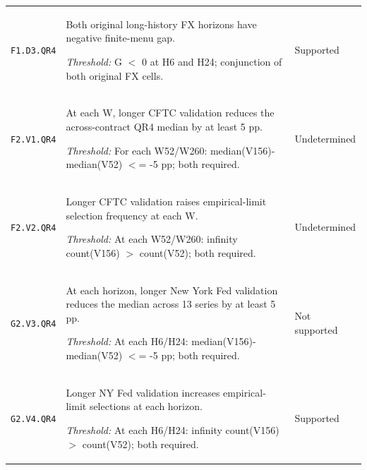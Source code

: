 \documentclass[12pt,a4paper]{article}
\begin{document}
{\begin{longtable}{p{2.0cm}p{10.5cm}p{2.5cm}}
\texttt{F1.\allowbreak{}D3.\allowbreak{}QR4} & Both original long-history FX horizons have negative finite-menu gap.\par\emph{Threshold:} G \ensuremath{<} 0 at H6 and H24; conjunction of both original FX cells. & Supported \\[3pt]
\texttt{F2.\allowbreak{}V1.\allowbreak{}QR4} & At each W, longer CFTC validation reduces the across-contract QR4 median by at least 5 pp.\par\emph{Threshold:} For each W52/\allowbreak{}W260: median(V156)-median(V52) \ensuremath{<}=\allowbreak{} -5 pp; both required. & Undetermined \\[3pt]
\texttt{F2.\allowbreak{}V2.\allowbreak{}QR4} & Longer CFTC validation raises empirical-limit selection frequency at each W.\par\emph{Threshold:} At each W52/\allowbreak{}W260: infinity count(V156) \ensuremath{>} count(V52); both required. & Undetermined \\[3pt]
\texttt{G2.\allowbreak{}V3.\allowbreak{}QR4} & At each horizon, longer New York Fed validation reduces the median across 13 series by at least 5 pp.\par\emph{Threshold:} At each H6/\allowbreak{}H24: median(V156)-median(V52) \ensuremath{<}=\allowbreak{} -5 pp; both required. & Not supported \\[3pt]
\texttt{G2.\allowbreak{}V4.\allowbreak{}QR4} & Longer NY Fed validation increases empirical-limit selections at each horizon.\par\emph{Threshold:} At each H6/\allowbreak{}H24: infinity count(V156) \ensuremath{>} count(V52); both required. & Supported \\[3pt]
\bottomrule\end{longtable}
}

\FloatBarrier


\FloatBarrier
\nocite{*}

\end{document}
